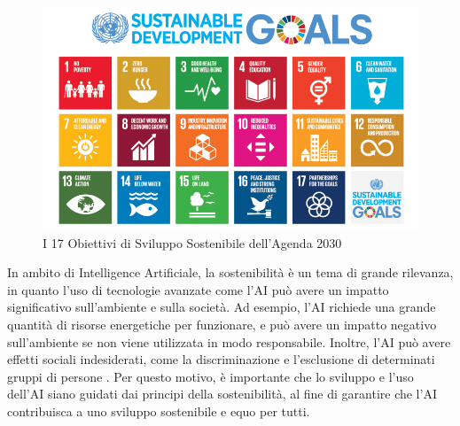 \begin{figure}[H]
    \centering
    \includegraphics[scale=0.5]{images/sdg.png}
\caption{I 17 Obiettivi di Sviluppo Sostenibile dell'Agenda 2030}
\end{figure}
\noindent In ambito di Intelligence Artificiale, la sostenibilità è un tema di grande rilevanza, in quanto l'uso di tecnologie avanzate come l'AI può avere un impatto significativo sull'ambiente e sulla società. Ad esempio, l'AI richiede una grande quantità di risorse energetiche per funzionare, e può avere un impatto negativo sull'ambiente se non viene utilizzata in modo responsabile. Inoltre, l'AI può avere effetti sociali indesiderati, come la discriminazione e l'esclusione di determinati gruppi di persone \cite{sostenibilitaAI}. Per questo motivo, è importante che lo sviluppo e l'uso dell'AI siano guidati dai principi della sostenibilità, al fine di garantire che l'AI contribuisca a uno sviluppo sostenibile e equo per tutti.


